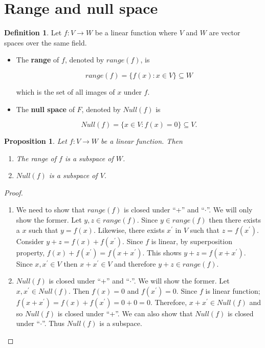 \documentclass[12pt]{article}
\newtheorem*{proposition}{Proposition}
\theoremstyle{definition}
\newtheorem*{definition}{Definition}
\begin{document}
\section{Range and null space}

\begin{definition}
Let $f : V \rightarrow W$ be a linear function where $V$ and $W$ are vector spaces over
the same field.

\begin{itemize}

\item [] The \textbf{range} of $f$, denoted by $range(f)$, is

\[ range(f) = \{f(x) : x \in V\} \subseteq W \]

which is the set of all images of $x$ under $f$.

\item [] The \textbf{null space} of $F$, denoted by $Null(f)$ is

\[ Null(f) = \{x \in V : f(x) = 0\} \subseteq V. \]
\end{itemize}
\end{definition}

\begin{proposition}
Let $f: V \rightarrow W$ be a linear function. Then
\begin{enumerate}[label = (\arabic*)]
\item The range of $f$ is a subspace of $W$.
\item $Null(f)$ is a subspace of $V$.
\end{enumerate}
\end{proposition}

\begin{proof}
\begin{enumerate}[label = (\arabic*)]
\item We need to show that $range(f)$ is closed under ``+'' and ``$\cdot$''. We will only
show the former. Let $y, z \in range(f)$. Since $y \in range(f)$ then there exists a $x$
such that $y = f(x)$. Likewise, there exists $x^{\prime}$ in $V$ such that $z = f(x^{\prime})$.
Consider $y + z = f(x) + f(x^{\prime})$. Since $f$ is linear, by superposition property,
$f(x) + f(x^{\prime}) = f(x + x^{\prime})$. This shows $y + z = f(x + x^{\prime})$. Since
$x, x^{\prime} \in V$ then $x + x^{\prime} \in V$ and therefore $y + z \in range(f)$.

\item $Null(f)$ is closed under ``+'' and ``$\cdot$''. We will show the former. Let
$x, x^{\prime} \in Null(f)$. Then $f(x) = 0$ and $f(x^{\prime}) = 0$. Since $f$ is
linear function; $f(x + x^{\prime}) = f(x) + f(x^{\prime}) = 0 + 0 = 0$. Therefore,
$x + x^{\prime} \in Null(f)$ and so $Null(f)$ is closed under ``+''. We can also show that
$Null(f)$ is closed under ``$\cdot$''. Thus $Null(f)$ is a subspace.
\end{enumerate}
\end{proof}
\end{document}
